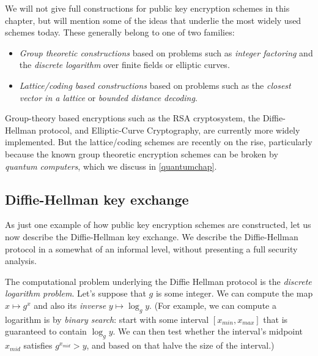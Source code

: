 We will not give full constructions for public key encryption schemes in
this chapter, but will mention some of the ideas that underlie the most
widely used schemes today. These generally belong to one of two
families:

\begin{itemize}
\item
  \emph{Group theoretic constructions} based on problems such as
  \emph{integer factoring} and the \emph{discrete logarithm} over finite
  fields or elliptic curves.
\item
  \emph{Lattice/coding based constructions} based on problems such as
  the \emph{closest vector in a lattice} or \emph{bounded distance
  decoding}.
\end{itemize}

Group-theory based encryptions such as the RSA cryptosystem, the
Diffie-Hellman protocol, and Elliptic-Curve Cryptography, are currently
more widely implemented. But the lattice/coding schemes are recently on
the rise, particularly because the known group theoretic encryption
schemes can be broken by \emph{quantum computers}, which we discuss in
\cref{quantumchap}.

\subsection{Diffie-Hellman key
exchange}\label{Diffie-Hellman-key-exchan}

As just one example of how public key encryption schemes are
constructed, let us now describe the Diffie-Hellman key exchange. We
describe the Diffie-Hellman protocol in a somewhat of an informal level,
without presenting a full security analysis.

The computational problem underlying the Diffie Hellman protocol is the
\emph{discrete logarithm problem}. Let's suppose that \(g\) is some
integer. We can compute the map \(x \mapsto g^x\) and also its
\emph{inverse} \(y \mapsto \log_g y\). (For example, we can compute a
logarithm is by \emph{binary search}: start with some interval
\([x_{min},x_{max}]\) that is guaranteed to contain \(\log_g y\). We can
then test whether the interval's midpoint \(x_{mid}\) satisfies
\(g^{x_{mid}} > y\), and based on that halve the size of the interval.)

